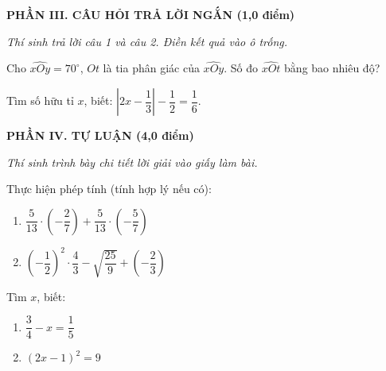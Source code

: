 \documentclass[12pt,a4paper]{article}
\begin{document}
\setcounter{ex}{0}
\noindent\textbf{\large PHẦN III. CÂU HỎI TRẢ LỜI NGẮN (1,0 điểm)}

\textit{Thí sinh trả lời câu 1 và câu 2. Điền kết quả vào ô trống.}

\vspace{1mm}
\begin{ex}
Cho $\widehat{xOy} = 70^\circ$, $Ot$ là tia phân giác của $\widehat{xOy}$. Số đo $\widehat{xOt}$ bằng bao nhiêu độ? 
\end{ex}

\begin{ex}
Tìm số hữu tỉ $x$, biết: $\left|2x - \dfrac{1}{3}\right| - \dfrac{1}{2} = \dfrac{1}{6}$. 
\end{ex}


\newpage
\setcounter{ex}{0}
\noindent\textbf{\large PHẦN IV. TỰ LUẬN (4,0 điểm)}

\textit{Thí sinh trình bày chi tiết lời giải vào giấy làm bài.}

\vspace{1mm}
\begin{ex}
Thực hiện phép tính (tính hợp lý nếu có):
\begin{enumerate}[label=\textbf{\alph*)}, leftmargin=0.8cm, itemsep=1pt]
\item $\dfrac{5}{13} \cdot \left(-\dfrac{2}{7}\right) + \dfrac{5}{13} \cdot \left(-\dfrac{5}{7}\right)$
\item $\left(-\dfrac{1}{2}\right)^2 \cdot \dfrac{4}{3} - \sqrt{\dfrac{25}{9}} + \left(-\dfrac{2}{3}\right)$
\end{enumerate}
\end{ex}
\vspace{2mm}

\begin{ex}
Tìm $x$, biết:
\begin{enumerate}[label=\textbf{\alph*)}, leftmargin=0.8cm, itemsep=1pt]
\item $\dfrac{3}{4} - x = \dfrac{1}{5}$
\item $(2x - 1)^2 = 9$
\end{enumerate}
\end{ex}
\vspace{2mm}
\end{document}
